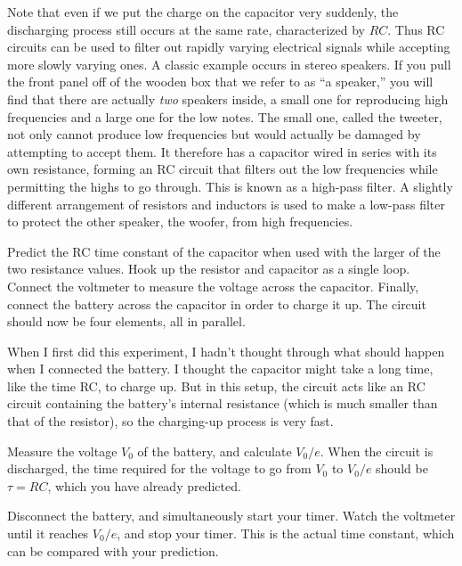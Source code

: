 Note that even if we put the charge on the capacitor very
suddenly, the discharging process still occurs at the same
rate, characterized by $RC$. Thus RC circuits can be used to
filter out rapidly varying electrical signals while
accepting more slowly varying ones. A classic example occurs
in stereo speakers. If you pull the front panel off of the
wooden box that we refer to as ``a speaker,'' you will find
that there are actually \emph{two} speakers inside, a small
one for reproducing high frequencies and a large one for the
low notes. The small one, called the tweeter, not only
cannot produce low frequencies but would actually be damaged
by attempting to accept them. It therefore has a capacitor
wired in series with its own resistance, forming an RC
circuit that filters out the low frequencies while
permitting the highs to go through. This is known as a
high-pass filter. A slightly different arrangement of
resistors and inductors is used to make a low-pass filter
to protect the other speaker, the woofer, from high frequencies. 

\observations


Predict the RC time constant of the capacitor when used with
the larger of the two resistance values. Hook up the resistor
and capacitor as a single loop. Connect the voltmeter to measure
the voltage across the capacitor. Finally, connect the battery
across the capacitor in order to charge it up. The circuit should
now be four elements, all in parallel.

When I first did this experiment, I hadn't thought through what
should happen when I connected the battery. I thought the capacitor
might take a long time, like the time RC, to charge up. But in this
setup, the circuit acts like an RC circuit containing the battery's
internal resistance (which is much smaller than that of the resistor),
so the charging-up process is very fast.

Measure the voltage $V_0$ of the battery, and calculate $V_0/e$. When
the circuit is discharged, the time required for the voltage to go from
$V_0$ to $V_0/e$ should be $\tau=RC$, which you have already predicted.

Disconnect the battery, and simultaneously start your timer.
Watch the voltmeter until it reaches $V_0/e$, and stop your timer.
This is the actual time constant, which can be compared with your
prediction.


